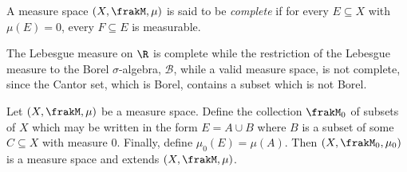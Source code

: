 \begin{definition}
    A measure space $(X,\frakM,\mu)$ is said to be \textit{complete} if for every $E\subseteq X$ with $\mu(E) = 0$, every $F\subseteq E$ is measurable.
\end{definition}

The Lebesgue measure on $\R$ is complete while the restriction of the Lebesgue measure to the Borel $\sigma$-algebra, $\mathcal B$, while a valid measure space, is not complete, since the Cantor set, which is Borel, contains a subset which is not Borel.

\begin{theorem}[Completion]
    Let $(X,\frakM,\mu)$ be a measure space. Define the collection $\frakM_0$ of subsets of $X$ which may be written in the form $E = A\cup B$ where $B$ is a subset of some $C\subseteq X$ with measure $0$. Finally, define $\mu_0(E) = \mu(A)$. Then $(X,\frakM_0,\mu_0)$ is a measure space and extends $(X,\frakM,\mu)$.
\end{theorem}
